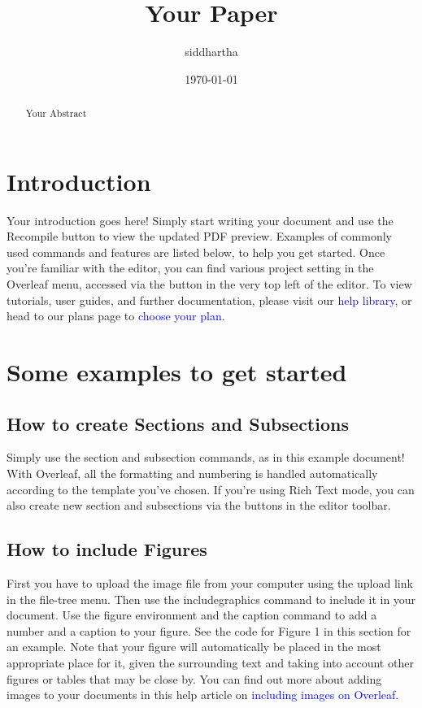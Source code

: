\documentclass{article}
\title{Your Paper}
\author{siddhartha}
\date{\today}
\begin{document}
	\maketitle
	
	\begin{abstract}
		Your Abstract
	\end{abstract}

\section{Introduction}
Your introduction goes here! Simply start writing your document and use the Recompile button to
view the updated PDF preview. Examples of commonly used commands and features are listed below,
to help you get started.
Once you’re familiar with the editor, you can find various project setting in the Overleaf menu,
accessed via the button in the very top left of the editor. To view tutorials, user guides, and further
documentation, please visit our {\textcolor{blue}{help library}}, or head to our plans page to {\textcolor{blue}{choose your plan.}}


\section{Some examples to get started}
\subsection{How to create Sections and Subsections}
Simply use the section and subsection commands, as in this example document! With Overleaf, all
the formatting and numbering is handled automatically according to the template you’ve chosen. If
you’re using Rich Text mode, you can also create new section and subsections via the buttons in the
editor toolbar.

\subsection{How to include Figures}
First you have to upload the image file from your computer using the upload link in the file-tree menu.
Then use the includegraphics command to include it in your document. Use the figure environment
and the caption command to add a number and a caption to your figure. See the code for Figure 1 in
this section for an example.
Note that your figure will automatically be placed in the most appropriate place for it, given the
surrounding text and taking into account other figures or tables that may be close by. You can find
out more about adding images to your documents in this help article on {\textcolor{blue}{including images on Overleaf.}}
\end{document}
